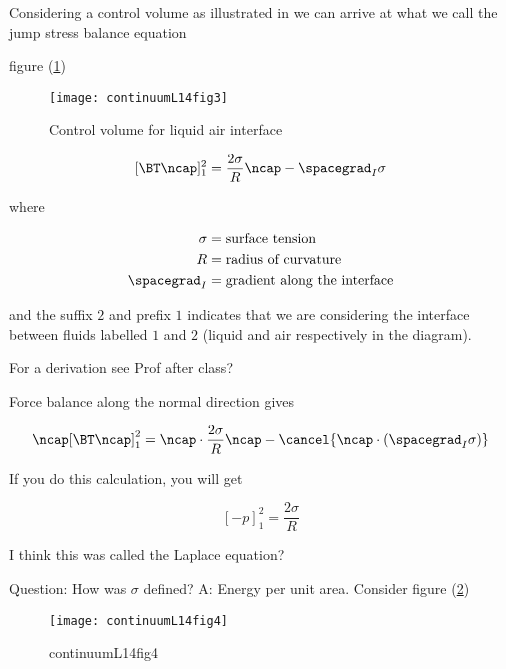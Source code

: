 Considering a control volume as illustrated in we can arrive at what we call the jump stress balance equation

figure (\ref{fig:continuumL14:continuumL14fig3})
\begin{figure}[htp]
   \centering
   \texttt{[image: continuumL14fig3]}
   \caption{Control volume for liquid air interface}\label{fig:continuumL14:continuumL14fig3}
\end{figure}

\begin{equation}\label{eqn:continuumL14:130}
[\BT \ncap]^2_1 = \frac{2 \sigma}{R} \ncap - \spacegrad_I \sigma
\end{equation}

where

\begin{align}\label{eqn:continuumL14:150}
\sigma &= \text{surface tension} \\
R &= \text{radius of curvature} \\
\spacegrad_I &= \text{gradient along the interface}
\end{align}

and the suffix $2$ and prefix $1$ indicates that we are considering the interface between fluids labelled $1$ and $2$ (liquid and air respectively in the diagram).

For a derivation see Prof after class?

Force balance along the normal direction gives

\begin{equation}\label{eqn:continuumL14:170}
\ncap [\BT \ncap]^2_1 = \ncap \cdot \frac{2 \sigma}{R} \ncap - \cancel{\ncap \cdot (\spacegrad_I \sigma)}
\end{equation}

If you do this calculation, you will get 

\begin{equation}\label{eqn:continuumL14:190}
[-p]^2_1 = \frac{ 2 \sigma}{R}
\end{equation}

I think this was called the Laplace equation?

Question: How was $\sigma$ defined?  A: Energy per unit area.  Consider figure (\ref{fig:continuumL14:continuumL14fig4})

\begin{figure}[htp]
   \centering
   \texttt{[image: continuumL14fig4]}
   \caption{continuumL14fig4}\label{fig:continuumL14:continuumL14fig4}
\end{figure}


